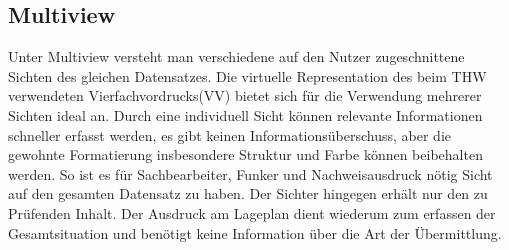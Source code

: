 \subsection{Multiview}
Unter Multiview versteht man verschiedene auf den Nutzer zugeschnittene Sichten des gleichen Datensatzes. Die virtuelle Representation des beim THW verwendeten Vierfachvordrucks(VV) bietet sich für die Verwendung mehrerer Sichten ideal an. Durch eine individuell Sicht können relevante Informationen schneller erfasst werden, es gibt keinen Informationsüberschuss, aber die gewohnte Formatierung insbesondere Struktur und Farbe können beibehalten werden. So ist es für Sachbearbeiter, Funker und Nachweisausdruck nötig Sicht auf den gesamten Datensatz zu haben. Der Sichter hingegen erhält nur den zu Prüfenden Inhalt. Der Ausdruck am Lageplan dient wiederum zum erfassen der Gesamtsituation und benötigt keine Information über die Art der Übermittlung.